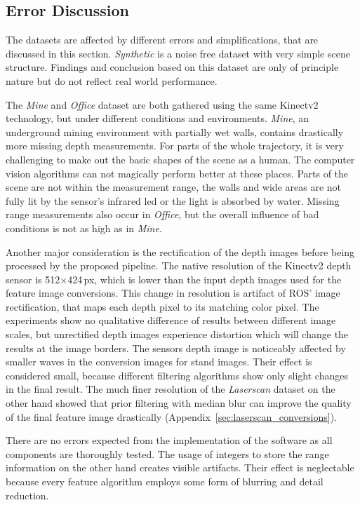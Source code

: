 \subsection{Error Discussion}

The datasets are affected by different errors and simplifications, that are discussed in this section.
\emph{Synthetic} is a noise free dataset with very simple scene structure.
Findings and conclusion based on this dataset are only of principle nature but do not reflect real world performance.

The \emph{Mine} and \emph{Office} dataset are both gathered using the same Kinectv2 technology, but under different conditions and environments.
\emph{Mine}, an underground mining environment with partially wet walls, contains drastically more missing depth measurements.
For parts of the whole trajectory, it is very challenging to make out the basic shapes of the scene as a human.
The computer vision algorithms can not magically perform better at these places.
Parts of the scene are not within the measurement range, the walls and wide areas are not fully lit by the sensor's infrared \acrshort{led} or the light is absorbed by water.
Missing range measurements also occur in \emph{Office}, but the overall influence of bad conditions is not as high as in \emph{Mine}.

Another major consideration is the rectification of the depth images before being processed by the proposed pipeline.
The native resolution of the Kinectv2 depth sensor is 512$\times$424\,px\cite{wasenmuller_accv2016}, which is lower than the input depth images used for the feature image conversions.
This change in resolution is artifact of \acrshort{ROS}' image rectification, that maps each depth pixel to its matching color pixel.
The experiments show no qualitative difference of results between different image scales, but unrectified depth images experience distortion which will change the results at the image borders.
The sensors depth image is noticeably affected by smaller waves in the conversion images for stand images.
Their effect is considered small, because different filtering algorithms show only slight changes in the final result.
The much finer resolution of the \emph{Laserscan} dataset on the other hand showed that prior filtering with median blur can improve the quality of the final feature image drastically (Appendix~\ref{sec:laserscan_conversions}).

There are no errors expected from the implementation of the software as all components are thoroughly tested.
The usage of integers to store the range information on the other hand creates visible artifacts.
Their effect is neglectable because every feature algorithm employs some form of blurring and detail reduction.
